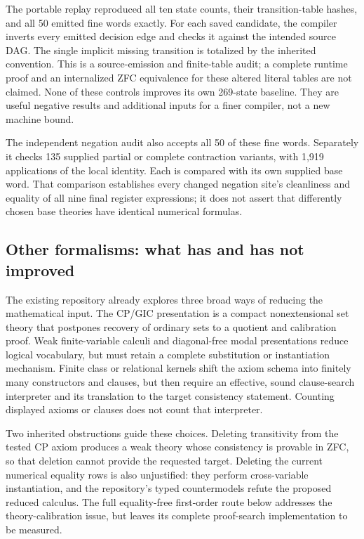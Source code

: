 The portable replay reproduced all ten state counts, their transition-table
hashes, and all 50 emitted fine words exactly.  For each saved candidate,
the compiler inverts every emitted decision edge and checks it against the
intended source DAG.  The single implicit missing transition is totalized
by the inherited convention.  This is a source-emission and finite-table
audit; a complete runtime proof and an internalized ZFC equivalence for
these altered literal tables are not claimed.  None of these controls
improves its own 269-state baseline.  They are useful negative results and
additional inputs for a finer compiler, not a new machine bound.

The independent negation audit also accepts all 50 of these fine words.
Separately it checks 135 supplied partial or complete contraction variants,
with 1,919 applications of the local identity.  Each is compared with its
own supplied base word.  That comparison establishes every changed
negation site's cleanliness and equality of all nine final register
expressions; it does not assert that differently chosen base theories have
identical numerical formulas.

\subsection{Other formalisms: what has and has not improved}

The existing repository already explores three broad ways of reducing the
mathematical input.  The CP/GIC presentation is a compact nonextensional
set theory that postpones recovery of ordinary sets to a quotient and
calibration proof.  Weak finite-variable calculi and diagonal-free modal
presentations reduce logical vocabulary, but must retain a complete
substitution or instantiation mechanism.  Finite class or relational
kernels shift the axiom schema into finitely many constructors and clauses,
but then require an effective, sound clause-search interpreter and its
translation to the target consistency statement.  Counting displayed
axioms or clauses does not count that interpreter.

Two inherited obstructions guide these choices.  Deleting transitivity
from the tested CP axiom produces a weak theory whose consistency is
provable in ZFC, so that deletion cannot provide the requested target.
Deleting the current numerical equality rows is also unjustified: they
perform cross-variable instantiation, and the repository's typed
countermodels refute the proposed reduced calculus.  The full equality-free
first-order route below addresses the theory-calibration issue, but leaves
its complete proof-search implementation to be measured.

